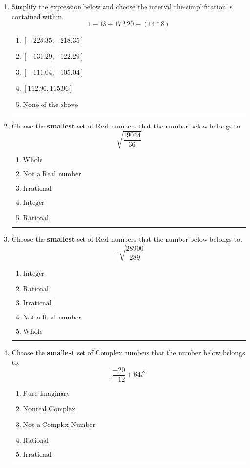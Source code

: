 \documentclass[14pt]{extbook}
\newcommand{\litem}[1]{\item#1\hspace*{-1cm}\rule{\textwidth}{0.4pt}}
\begin{document}
\begin{enumerate}
\litem{
Simplify the expression below and choose the interval the simplification is contained within.\[ 1 - 13 \div 17 * 20 - (14 * 8) \]\begin{enumerate}[label=\Alph*.]
\item \( [-228.35, -218.35] \)
\item \( [-131.29, -122.29] \)
\item \( [-111.04, -105.04] \)
\item \( [112.96, 115.96] \)
\item \( \text{None of the above} \)

\end{enumerate} }
\litem{
Choose the \textbf{smallest} set of Real numbers that the number below belongs to.\[ \sqrt{\frac{19044}{36}} \]\begin{enumerate}[label=\Alph*.]
\item \( \text{Whole} \)
\item \( \text{Not a Real number} \)
\item \( \text{Irrational} \)
\item \( \text{Integer} \)
\item \( \text{Rational} \)

\end{enumerate} }
\litem{
Choose the \textbf{smallest} set of Real numbers that the number below belongs to.\[ -\sqrt{\frac{28900}{289}} \]\begin{enumerate}[label=\Alph*.]
\item \( \text{Integer} \)
\item \( \text{Rational} \)
\item \( \text{Irrational} \)
\item \( \text{Not a Real number} \)
\item \( \text{Whole} \)

\end{enumerate} }
\litem{
Choose the \textbf{smallest} set of Complex numbers that the number below belongs to.\[ \frac{-20}{-12}+64i^2 \]\begin{enumerate}[label=\Alph*.]
\item \( \text{Pure Imaginary} \)
\item \( \text{Nonreal Complex} \)
\item \( \text{Not a Complex Number} \)
\item \( \text{Rational} \)
\item \( \text{Irrational} \)


\end{enumerate}}
\end{enumerate}
\end{document}

